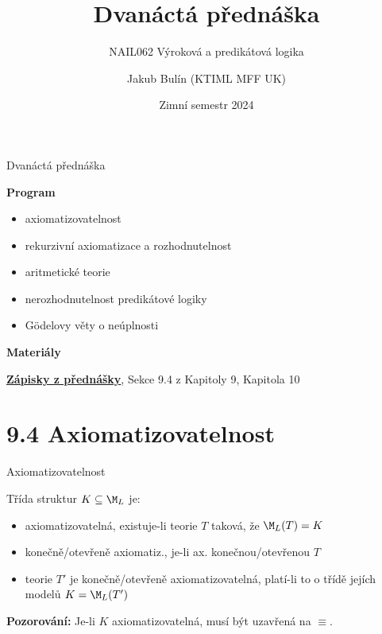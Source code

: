 \documentclass{beamer}
\title{Dvanáctá přednáška}
\subtitle{NAIL062 Výroková a predikátová logika}
\author{Jakub Bulín (KTIML MFF UK)}
\date{Zimní semestr 2024}
\begin{document}
\maketitle


\begin{frame}{Dvanáctá přednáška}

    \textbf{Program}
        \begin{itemize}            
            \item axiomatizovatelnost
            \item rekurzivní axiomatizace a rozhodnutelnost
            \item aritmetické teorie
            \item nerozhodnutelnost predikátové logiky
            \item Gödelovy věty o neúplnosti
        \end{itemize}

    \textbf{Materiály}

        \href{https://github.com/jbulin-mff-uk/nail062/raw/main/lecture/lecture-notes/lecture-notes.pdf}{\alert{\textbf{Zápisky z přednášky}}}, Sekce 9.4 z Kapitoly 9, Kapitola 10

\end{frame}


\section{9.4 Axiomatizovatelnost}


\begin{frame}{Axiomatizovatelnost}
        
    Třída struktur $K\subseteq\M_L$ je:
    
    \begin{itemize}
        \item \alert{axiomatizovatelná}, existuje-li teorie $T$ taková, že $\M_L(T)=K$
        \item \alert{konečně}/\alert{otevřeně} axiomatiz., je-li ax. konečnou/otevřenou $T$
        \item teorie $T'$ je \alert{konečně}/\alert{otevřeně} axiomatizovatelná, platí-li to o třídě jejích modelů $K=\M_L(T')$
    \end{itemize}

    \textbf{Pozorování:} Je-li $K$ axiomatizovatelná, musí být uzavřená na $\equiv$.

    \medskip
    

\end{frame}
\end{document}

